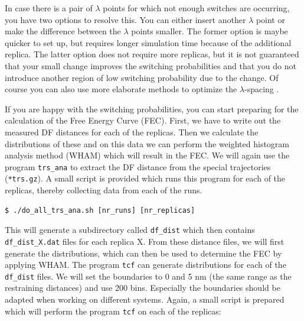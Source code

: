 In case there is a pair of $\lambda$ points for which not enough switches are occurring, you have two options to resolve this. 
You can either insert another $\lambda$ point or make the difference between the $\lambda$ points smaller. 
The former option is maybe quicker to set up, but requires longer simulation time because of the additional replica. 
The latter option does not require more replicas, but it is not guaranteed that your small change improves the switching probabilities and that you do not introduce another region of low switching probability due to the change.
Of course you can also use more elaborate methods to optimize the $\lambda$-spacing \cite{Hritz_2007}.

If you are happy with the switching probabilities, you can start preparing for the calculation of the Free Energy Curve (FEC).
First, we have to write out the measured DF distances for each of the replicas. Then we calculate the distributions of these and on this data we can perform the weighted histogram analysis method (WHAM) which will result in the FEC.
We will again use the program \texttt{trs\_ana} to extract the DF distance from the special trajectories (\texttt{*trs.gz}). 
A small script is provided which runs this program for each of the replicas, thereby collecting data from each of the runs.

\begin{lstlisting}
$ ./do_all_trs_ana.sh [nr_runs] [nr_replicas]
\end{lstlisting}
This will generate a subdirectory called \texttt{df\_dist} which then contains \texttt{df\_dist\_X.dat} files for each replica X. 
From these distance files, we will first generate the distributions, which can then be used to determine the FEC by applying WHAM. 
The program \texttt{tcf} can generate distributions for each of the \texttt{df\_dist} files. 
We will set the boundaries to 0 and 5 nm (the same range as the restraining distances) and use 200 bins. 
Especially the boundaries should be adapted when working on different systems. 
Again, a small script is prepared which will perform the program \texttt{tcf} on each of the replicas:

